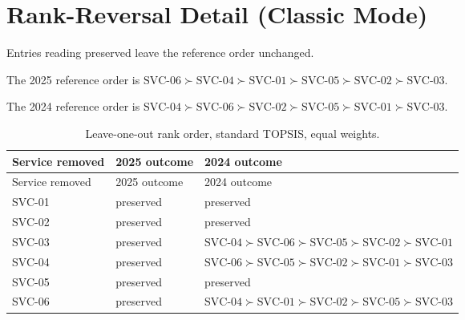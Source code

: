 \documentclass[
  12pt,
  letterpaper,
  12pt,
  oneside,
  english,
  onehalfspacing,
  headsepline]{MastersDoctoralThesis}
\begin{document}
\section{Rank-Reversal Detail (Classic
Mode)}\label{rank-reversal-detail-classic-mode}

Entries reading preserved leave the reference order unchanged.

The 2025 reference order is
\(\text{SVC-06} \succ \text{SVC-04} \succ \text{SVC-01} \succ \text{SVC-05} \succ \text{SVC-02} \succ \text{SVC-03}\).

The 2024 reference order is
\(\text{SVC-04} \succ \text{SVC-06} \succ \text{SVC-02} \succ \text{SVC-05} \succ \text{SVC-01} \succ \text{SVC-03}\).

\begin{longtable}[]{@{}
  >{\raggedright\arraybackslash}p{}
  >{\raggedright\arraybackslash}p{}
  >{\raggedright\arraybackslash}p{}@{}}
\caption{Leave-one-out rank order, standard TOPSIS, equal
weights.}\label{tbl-appc-rankreversal}\tabularnewline
\toprule\noalign{}
\begin{minipage}[b]{\linewidth}\raggedright
Service removed
\end{minipage} & \begin{minipage}[b]{\linewidth}\raggedright
2025 outcome
\end{minipage} & \begin{minipage}[b]{\linewidth}\raggedright
2024 outcome
\end{minipage} \\
\midrule\noalign{}
\endfirsthead
\toprule\noalign{}
\begin{minipage}[b]{\linewidth}\raggedright
Service removed
\end{minipage} & \begin{minipage}[b]{\linewidth}\raggedright
2025 outcome
\end{minipage} & \begin{minipage}[b]{\linewidth}\raggedright
2024 outcome
\end{minipage} \\
\midrule\noalign{}
\endhead
\bottomrule\noalign{}
\endlastfoot
SVC-01 & preserved & preserved \\
SVC-02 & preserved & preserved \\
SVC-03 & preserved &
\(\text{SVC-04} \succ \text{SVC-06} \succ \text{SVC-05} \succ \text{SVC-02} \succ \text{SVC-01}\) \\
SVC-04 & preserved &
\(\text{SVC-06} \succ \text{SVC-05} \succ \text{SVC-02} \succ \text{SVC-01} \succ \text{SVC-03}\) \\
SVC-05 & preserved & preserved \\
SVC-06 & preserved &
\(\text{SVC-04} \succ \text{SVC-01} \succ \text{SVC-02} \succ \text{SVC-05} \succ \text{SVC-03}\) \\
\end{longtable}
\end{document}
